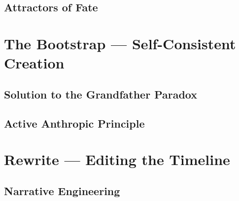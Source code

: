 \documentclass[11pt,a4paper,twoside]{book}
\begin{document}
\chapter{Attractors of Fate}




\part{The Bootstrap --- Self-Consistent Creation}

\chapter{Solution to the Grandfather Paradox}




\chapter{Active Anthropic Principle}




\part{Rewrite --- Editing the Timeline}

\chapter{Narrative Engineering}



\end{document}
